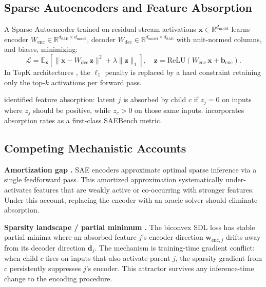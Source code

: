 \documentclass{article}
\begin{document}
\subsection{Sparse Autoencoders and Feature Absorption}

A Sparse Autoencoder trained on residual stream activations $\mathbf{x} \in \mathbb{R}^{d_\mathrm{model}}$
learns encoder $W_\mathrm{enc} \in \mathbb{R}^{d_\mathrm{SAE} \times d_\mathrm{model}}$,
decoder $W_\mathrm{dec} \in \mathbb{R}^{d_\mathrm{model} \times d_\mathrm{SAE}}$ with
unit-normed columns, and biases, minimizing:
\begin{equation}
\mathcal{L} = \mathbb{E}_\mathbf{x}\!\left[\|\mathbf{x} - W_\mathrm{dec}\,\mathbf{z}\|^2
  + \lambda \|\mathbf{z}\|_1\right], \quad
\mathbf{z} = \mathrm{ReLU}(W_\mathrm{enc}\,\mathbf{x} + \mathbf{b}_\mathrm{enc}).
\end{equation}
In TopK architectures \citep{makhzani2015winner, templeton2024scaling}, the $\ell_1$ penalty
is replaced by a hard constraint retaining only the top-$k$ activations per forward pass.

\citet{chanin2024absorption} identified feature absorption: latent $j$ is absorbed by child
$c$ if $z_j = 0$ on inputs where $z_j$ should be positive, while $z_c > 0$ on those same
inputs. \citet{karvonen2025saebench} incorporates absorption rates as a first-class SAEBench
metric.

\subsection{Competing Mechanistic Accounts}

\textbf{Amortization gap \citep{oneill2024amortization}.} SAE encoders approximate optimal
sparse inference via a single feedforward pass. This amortized approximation systematically
under-activates features that are weakly active or co-occurring with stronger features. Under
this account, replacing the encoder with an oracle solver should eliminate absorption.

\textbf{Sparsity landscape / partial minimum \citep{tang2024unified}.} The biconvex SDL loss
has stable partial minima where an absorbed feature $j$'s encoder direction
$\mathbf{w}_{\mathrm{enc},j}$ drifts away from its decoder direction $\mathbf{d}_j$.
The mechanism is training-time gradient conflict: when child $c$ fires on inputs that also
activate parent $j$, the sparsity gradient from $c$ persistently suppresses $j$'s encoder.
This attractor survives any inference-time change to the encoding procedure.
\end{document}
